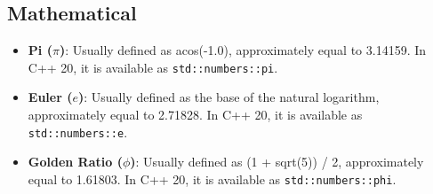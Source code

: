 \subsection{Mathematical}

\begin{itemize}
    \item \textbf{Pi ($\pi$)}: Usually defined as acos(-1.0), approximately equal to 3.14159. In C++ 20, it is available as \texttt{std::numbers::pi}.
    \item \textbf{Euler ($e$)}: Usually defined as the base of the natural logarithm, approximately equal to 2.71828. In C++ 20, it is available as \texttt{std::numbers::e}.
    \item \textbf{Golden Ratio ($\phi$)}: Usually defined as (1 + sqrt(5)) / 2, approximately equal to 1.61803. In C++ 20, it is available as \texttt{std::numbers::phi}.
\end{itemize}